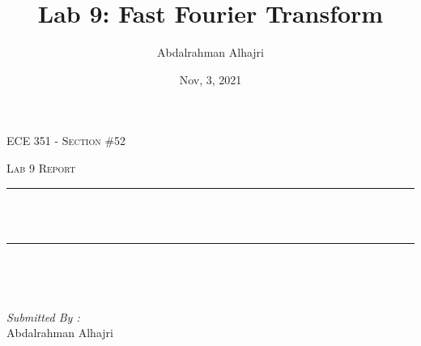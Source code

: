 \documentclass[12pt]{report}
\title{Lab 9: Fast Fourier Transform}
\author{Abdalrahman Alhajri}
\date{Nov, 3, 2021}
\makeatletter
\let\thetitle\@title
\makeatother
\begin{document}

\begin{titlepage}
	\centering
    \vspace*{0.5 cm}
\begin{center}    \textsc{\Large   ECE 351 - Section \#52 }\\[2.0 cm]	\end{center}%
	\textsc{\Large Lab 9 Report }\\[0.5 cm]				%
	\rule{\linewidth}{0.2 mm} \\[0.4 cm]
	{ \huge \bfseries \thetitle}\\
	\rule{\linewidth}{0.2 mm} \\[1.5 cm]
	
	\begin{minipage}{0.4\textwidth}
		\begin{flushleft} \large
			\end{flushleft}
			\end{minipage}~
			\begin{minipage}{0.4\textwidth}
            
			\begin{flushright} \large
			\emph{Submitted By :} \\
			Abdalrahman Alhajri
		\end{flushright}
           
	\end{minipage}\\[2 cm]
	
    
    
    
    
	
\end{titlepage}


\tableofcontents
\pagebreak

\renewcommand{\thesection}{\arabic{section}}
\end{document}
